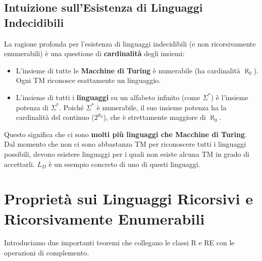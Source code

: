 \documentclass[a4paper]{article}
\begin{document}
\subsection{Intuizione sull'Esistenza di Linguaggi Indecidibili}

La ragione profonda per l'esistenza di linguaggi indecidibili (e non ricorsivamente enumerabili) è una questione di \textbf{cardinalità} degli insiemi:
\begin{itemize}
    \item L'insieme di tutte le \textbf{Macchine di Turing} è numerabile (ha cardinalità $\aleph_0$). Ogni TM riconosce esattamente un linguaggio.
    \item L'insieme di tutti i \textbf{linguaggi} su un alfabeto infinito (come $\Sigma^*$) è l'insieme potenza di $\Sigma^*$. Poiché $\Sigma^*$ è numerabile, il suo insieme potenza ha la cardinalità del continuo ($2^{\aleph_0}$), che è strettamente maggiore di $\aleph_0$.
\end{itemize}
Questo significa che ci sono \textbf{molti più linguaggi che Macchine di Turing}. Dal momento che non ci sono abbastanza TM per riconoscere tutti i linguaggi possibili, devono esistere linguaggi per i quali non esiste alcuna TM in grado di accettarli. $L_D$ è un esempio concreto di uno di questi linguaggi.

\section{Proprietà sui Linguaggi Ricorsivi e Ricorsivamente Enumerabili}

Introduciamo due importanti teoremi che collegano le classi R e RE con le operazioni di complemento.
\end{document}
